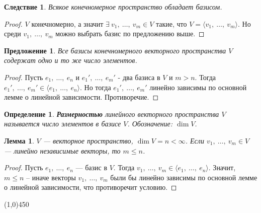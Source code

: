 \documentclass[a4paper,12pt]{article}
\newtheorem*{definition}{Определение}
\newtheorem*{proposal}{Предложение}
\newtheorem*{consequence}{Следствие}
\newtheorem*{lemma}{Лемма}
\begin{document}
	\begin{consequence}
		Всякое конечномерное пространство обладает базисом.
	\end{consequence}
	\begin{proof}
		$V$ конечномерно, а значит $\exists\ v_1,\ \ldots,\ v_m \in V$ такие, что $V = \langle v_1,\ \ldots,\ v_m\rangle$. Но среди $v_1,\ \ldots,\ v_m$ можно выбрать базис по предложению выше.
	\end{proof}
	\begin{proposal}
		Все базисы конечномерного векторного пространства $V$ содержат одно и то же число элементов. 
	\end{proposal}
	\begin{proof}
		Пусть $e_1,\ \ldots,\ e_n$ и $e_1',\ \ldots,\ e_m'$ - два базиса в $V$ и $m>n$. Тогда $e_1',\ \ldots,\ e_m' \in \langle e_1,\ \ldots,\ e_n\rangle$. Но тогда $e_1',\ \ldots,\ e_m'$ линейно зависимы по основной лемме о линейной зависимости. Противоречие.
	\end{proof}
	\begin{definition}
		\textbf{Размерностью} линейного векторного пространства $V$ называется число элементов в базисе $V$. Обозначение: $\dim V$. 
	\end{definition}
	\begin{lemma}
		$V$ — векторное пространство, $\dim V = n < \infty$. Если $v_1,\ \ldots,\ v_m \in V$ — линейно независимые векторы, то $m \leqslant n$.
	\end{lemma}
	\begin{proof}
		Пусть $e_1,\ \ldots,\ e_n$ — базис в $V$. Тогда $v_1,\ \ldots,\ v_m \in \langle e_1,\ \ldots,\ e_n\rangle$. Значит,  $m \leqslant n$ -- иначе векторы $v_1,\ \ldots,\ v_m$ были бы линейно зависимы по основной лемме о линейной зависимости, что противоречит условию.
	\end{proof}	
	\begin{center}
		\line(1,0){450}
	\end{center}
\end{document}
